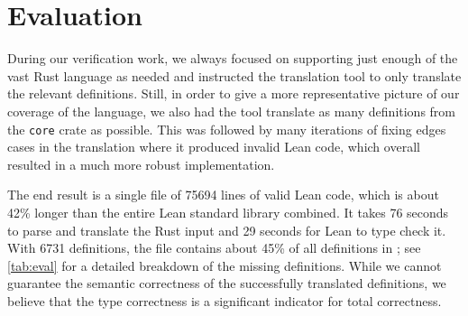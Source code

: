 \section{Evaluation}
\label{sec:eval}

During our verification work, we always focused on supporting just enough of the vast Rust
language as needed and instructed the translation tool to only translate the
relevant definitions. Still, in order to give a more representative picture of
our coverage of the language, we also had the tool translate as many definitions
from the \verb!core! crate as possible. This was followed by many iterations of
fixing edges cases in the translation where it produced invalid Lean code, which
overall resulted in a much more robust implementation.

The end result is a single file of 75694 lines of valid Lean code, which
is about 42\% longer than the entire Lean standard library combined.
It takes 76 seconds to parse and translate the Rust input and 29 seconds for
Lean to type check it. With 6731
definitions, the file contains about 45\% of all definitions in ; see
\autoref{tab:eval} for a detailed breakdown of the missing definitions. While we
cannot guarantee the semantic correctness of the successfully translated
definitions, we believe that the type correctness is a significant indicator
for total correctness.

